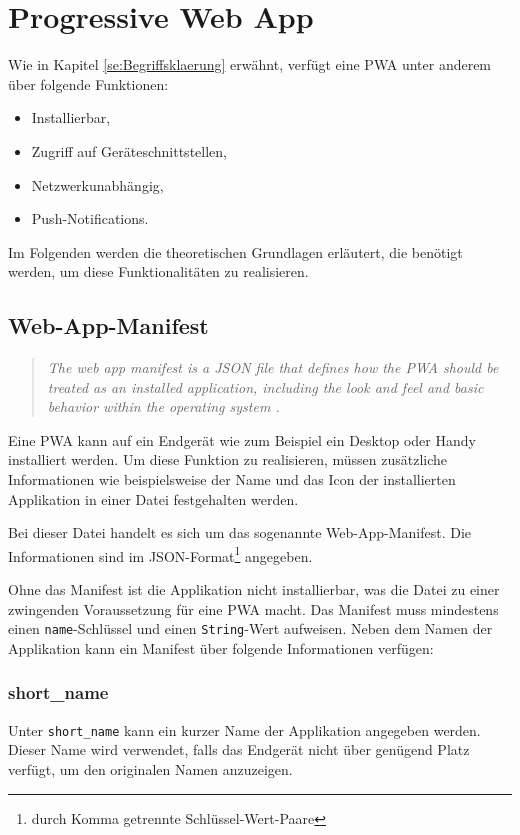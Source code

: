 
\chapter{Progressive Web App}

Wie in Kapitel \ref{se:Begriffsklaerung} erwähnt, verfügt eine PWA unter anderem über folgende Funktionen: 
\begin{itemize}
    \item Installierbar,
    \item Zugriff auf Geräteschnittstellen, 
    \item Netzwerkunabhängig,
    \item Push-Notifications.
\end{itemize} 

Im Folgenden werden die theoretischen Grundlagen erläutert, die benötigt werden, um diese Funktionalitäten zu realisieren. 


\section{Web-App-Manifest}\label{sec:webappmanifest}

\begin{quote}
   \textit{The web app manifest is a JSON file that defines how the PWA should be treated as an installed application, including the look and feel and basic behavior within the operating system \cite{Developers2022}. }
\end{quote}

Eine PWA kann auf ein Endgerät wie zum Beispiel ein Desktop oder Handy installiert werden. Um diese Funktion zu realisieren, müssen zusätzliche Informationen wie beispielsweise der Name und das Icon der installierten Applikation in einer Datei festgehalten werden. 

Bei dieser Datei handelt es sich um das sogenannte Web-App-Manifest. Die Informationen sind im \ac{JSON}-Format\footnote{durch Komma getrennte Schlüssel-Wert-Paare} angegeben. 

Ohne das Manifest ist die Applikation nicht installierbar, was die Datei zu einer zwingenden Voraussetzung für eine PWA macht. 
Das Manifest muss mindestens einen \texttt{name}-Schlüssel und einen \texttt{String}-Wert aufweisen. 
Neben dem Namen der Applikation kann ein Manifest über folgende Informationen verfügen: 

\subsection{short\_name}
Unter \texttt{short\_name} kann ein kurzer Name der Applikation angegeben werden. Dieser Name wird verwendet, falls das Endgerät nicht über genügend Platz verfügt, um den originalen Namen anzuzeigen. 

